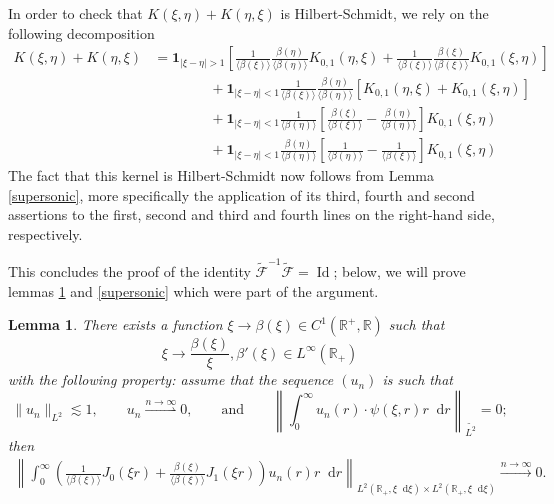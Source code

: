\documentclass[11 pt]{amsart}
\newtheorem{lem}{Lemma}[section]
\theoremstyle{definition}
\theoremstyle{remark}
\numberwithin{equation}{section}
\newcommand{\dd}{\mathop{}\!\mathrm{d}}
\begin{document}
In order to check that $K(\xi,\eta) + K(\eta,\xi)$ is Hilbert-Schmidt, we rely on the following decomposition
\begin{align*}
K (\xi, \eta) + K (\eta, \xi) & = \mathbf{1}_{|\xi-\eta| > 1} \left[ \frac{1}{\langle \beta (\xi) \rangle} \frac{\beta(\eta)}{\langle \beta (\eta) \rangle} K_{0, 1} (\eta, \xi) + \frac{1}{\langle \beta (\xi) \rangle} \frac{\beta (\xi)}{\langle \beta (\xi) \rangle} K_{0, 1} (\xi, \eta) \right] \\
& \qquad \qquad + \mathbf{1}_{|\xi-\eta| < 1}  \frac{1}{\langle \beta (\xi) \rangle} \frac{\beta (\eta)}{\langle \beta (\eta) \rangle} \left[K_{0, 1} (\eta, \xi) + K_{0, 1} (\xi, \eta) \right] \\
& \qquad \qquad + \mathbf{1}_{|\xi-\eta| < 1} 
   \frac{1}{\langle \beta (\eta) \rangle}  \left[ \frac{\beta (\xi)}{\langle \beta (\xi) \rangle} - \frac{\beta(\eta)}{\langle \beta (\eta) \rangle} \right] K_{0, 1} (\xi, \eta) \\
& \qquad \qquad + \mathbf{1}_{|\xi-\eta| < 1} \frac{\beta
    (\eta)}{\langle \beta (\eta) \rangle}
    \left[ \frac{1}{\langle \beta (\eta) \rangle} - \frac{1}{\langle \beta (\xi) \rangle} \right] K_{0, 1} (\xi, \eta)
  \end{align*}
The fact that this kernel is Hilbert-Schmidt now follows from Lemma \ref{supersonic}, more specifically the application of its third, fourth and second assertions to the first, second and third and fourth lines on the right-hand side, respectively.

This concludes the proof of the identity $\widetilde{\mathcal{F}}^{-1} \widetilde{\mathcal{F}} = \operatorname{Id}$; below, we will prove lemmas \ref{hypersonic} and \ref{supersonic} which were part of the argument.

\begin{lem} \label{hypersonic} There exists a function $\xi \rightarrow \beta(\xi) \in C^1(\mathbb{R}^+,\mathbb{R})$ such that
$$
\xi \rightarrow\frac{\beta(\xi)}{\xi}, \beta'(\xi) \in L^\infty (\mathbb{R}_+)
$$
with the following property: assume that the sequence $(u_n)$ is such that
$$
\| u_n \|_{L^2} \lesssim 1, \qquad  u_n \overset{n \to \infty}{\rightharpoonup} 0, \qquad \mbox{and} \qquad \left\|  \int_0^\infty u_n (r)\cdot \psi (\xi, r) r \dd r  \right\|_{\widetilde{L^2}} = 0;
$$
then
\begin{align*}
\left\| \int_0^\infty \left( \frac{1}{\langle \beta (\xi) \rangle} J_0 (\xi r) + \frac{\beta (\xi)}{\langle \beta (\xi) \rangle} J_1 (\xi r) \right) u_{n} (r) r \dd r \right\|_{L^2(\mathbb{R}_+,\xi \dd \xi)\times L^2(\mathbb{R}_+,\xi \dd \xi)} \overset{n \to \infty}{\longrightarrow} 0.
\end{align*}
\end{lem}
\end{document}
